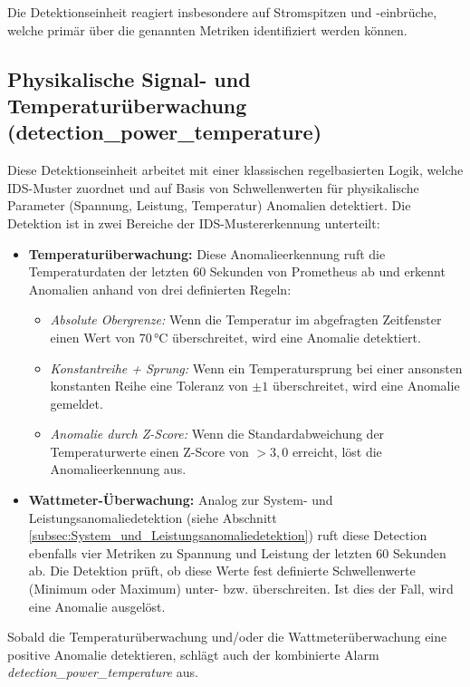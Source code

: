    Die Detektionseinheit reagiert insbesondere auf Stromspitzen und -einbrüche, welche primär über die genannten Metriken identifiziert werden können.

    \subsection{Physikalische Signal- und Temperaturüberwachung (detection\_power\_temperature)}
    \label{subsec:physikalische_signale_und_temperaturueberwachung}

    Diese Detektionseinheit arbeitet mit einer klassischen regelbasierten Logik, welche IDS-Muster zuordnet und auf Basis von Schwellenwerten für physikalische Parameter (Spannung, Leistung, Temperatur) Anomalien detektiert. Die Detektion ist in zwei Bereiche der IDS-Mustererkennung unterteilt:

    \begin{itemize}
        \item \textbf{Temperaturüberwachung:} Diese Anomalieerkennung ruft die Temperaturdaten der letzten 60 Sekunden von Prometheus ab und erkennt Anomalien anhand von drei definierten Regeln:
        \begin{itemize}
            \item \textit{Absolute Obergrenze:} Wenn die Temperatur im abgefragten Zeitfenster einen Wert von 70\,°C überschreitet, wird eine Anomalie detektiert.
            \item \textit{Konstantreihe + Sprung:} Wenn ein Temperatursprung bei einer ansonsten konstanten Reihe eine Toleranz von $\pm 1$ überschreitet, wird eine Anomalie gemeldet.
            \item \textit{Anomalie durch Z-Score:} Wenn die Standardabweichung der Temperaturwerte einen Z-Score von $> 3,0$ erreicht, löst die Anomalieerkennung aus.
        \end{itemize}
        \item \textbf{Wattmeter-Überwachung:} Analog zur System- und Leistungsanomaliedetektion (siehe Abschnitt \ref{subsec:System_und_Leistungsanomaliedetektion}) ruft diese Detection ebenfalls vier Metriken zu Spannung und Leistung der letzten 60 Sekunden ab. Die Detektion prüft, ob diese Werte fest definierte Schwellenwerte (Minimum oder Maximum) unter- bzw. überschreiten. Ist dies der Fall, wird eine Anomalie ausgelöst.
    \end{itemize}

    Sobald die Temperaturüberwachung und/oder die Wattmeterüberwachung eine positive Anomalie detektieren, schlägt auch der kombinierte Alarm \textit{detection\_power\_temperature} aus.

